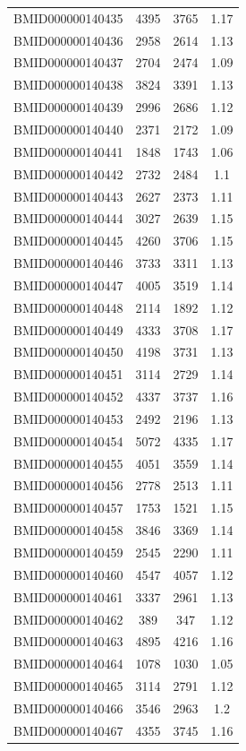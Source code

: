 \documentclass{bmcart}
\begin{document}
\begin{backmatter}
\begin{center}
\begin{longtable}{c|c|c|c}
BMID000000140435 & 4395 & 3765 & 1.17 \\
BMID000000140436 & 2958 & 2614 & 1.13 \\
BMID000000140437 & 2704 & 2474 & 1.09 \\
BMID000000140438 & 3824 & 3391 & 1.13 \\
BMID000000140439 & 2996 & 2686 & 1.12 \\
BMID000000140440 & 2371 & 2172 & 1.09 \\
BMID000000140441 & 1848 & 1743 & 1.06 \\
BMID000000140442 & 2732 & 2484 & 1.1 \\
BMID000000140443 & 2627 & 2373 & 1.11 \\
BMID000000140444 & 3027 & 2639 & 1.15 \\
BMID000000140445 & 4260 & 3706 & 1.15 \\
BMID000000140446 & 3733 & 3311 & 1.13 \\
BMID000000140447 & 4005 & 3519 & 1.14 \\
BMID000000140448 & 2114 & 1892 & 1.12 \\
BMID000000140449 & 4333 & 3708 & 1.17 \\
BMID000000140450 & 4198 & 3731 & 1.13 \\
BMID000000140451 & 3114 & 2729 & 1.14 \\
BMID000000140452 & 4337 & 3737 & 1.16 \\
BMID000000140453 & 2492 & 2196 & 1.13 \\
BMID000000140454 & 5072 & 4335 & 1.17 \\
BMID000000140455 & 4051 & 3559 & 1.14 \\
BMID000000140456 & 2778 & 2513 & 1.11 \\
BMID000000140457 & 1753 & 1521 & 1.15 \\
BMID000000140458 & 3846 & 3369 & 1.14 \\
BMID000000140459 & 2545 & 2290 & 1.11 \\
BMID000000140460 & 4547 & 4057 & 1.12 \\
BMID000000140461 & 3337 & 2961 & 1.13 \\
BMID000000140462 & 389 & 347 & 1.12 \\
BMID000000140463 & 4895 & 4216 & 1.16 \\
BMID000000140464 & 1078 & 1030 & 1.05 \\
BMID000000140465 & 3114 & 2791 & 1.12 \\
BMID000000140466 & 3546 & 2963 & 1.2 \\
BMID000000140467 & 4355 & 3745 & 1.16 \\

\end{longtable}
\end{center}
\end{backmatter}
\end{document}

